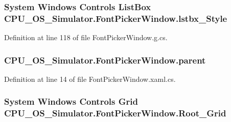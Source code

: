 \subsubsection[{lstbx\+\_\+\+Style}]{\setlength{\rightskip}{0pt plus 5cm}System Windows Controls List\+Box C\+P\+U\+\_\+\+O\+S\+\_\+\+Simulator.\+Font\+Picker\+Window.\+lstbx\+\_\+\+Style\hspace{0.3cm}{\ttfamily [package]}}\label{class_c_p_u___o_s___simulator_1_1_font_picker_window_adf923069128ca0ca766c810601319286}


Definition at line 118 of file Font\+Picker\+Window.\+g.\+cs.

\hypertarget{class_c_p_u___o_s___simulator_1_1_font_picker_window_a4e59cc593e060f3229adc8decfeb151c}{}
\subsubsection[{parent}]{ C\+P\+U\+\_\+\+O\+S\+\_\+\+Simulator.\+Font\+Picker\+Window.\+parent\hspace{0.3cm}{\ttfamily [private]}}\label{class_c_p_u___o_s___simulator_1_1_font_picker_window_a4e59cc593e060f3229adc8decfeb151c}


Definition at line 14 of file Font\+Picker\+Window.\+xaml.\+cs.

\hypertarget{class_c_p_u___o_s___simulator_1_1_font_picker_window_a549891835e07203b79f3e81fb225c596}{}
\subsubsection[{Root\+\_\+\+Grid}]{\setlength{\rightskip}{0pt plus 5cm}System Windows Controls Grid C\+P\+U\+\_\+\+O\+S\+\_\+\+Simulator.\+Font\+Picker\+Window.\+Root\+\_\+\+Grid\hspace{0.3cm}{\ttfamily [package]}}\label{class_c_p_u___o_s___simulator_1_1_font_picker_window_a549891835e07203b79f3e81fb225c596}



